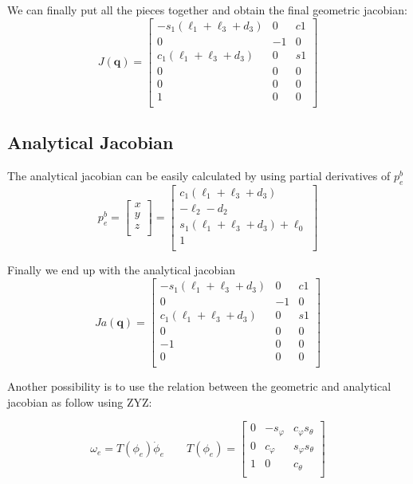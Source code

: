 \documentclass[a4paper,12pt]{article}
\renewcommand*{\l}{\ell}
\newcommand*{\q}{\bm{q}}
\begin{document}
We can finally put all the pieces together and obtain the final geometric jacobian:
\[
J(\q) = 
\begin{bmatrix}
    -s_1(\l_1 + \l_3 + d_3) &  0 & c1 \\
     0 &  -1 & 0 \\
     c_1(\l_1 + \l_3 + d_3) & 0 & s1 \\
    0 & 0 & 0 \\
    0 & 0 & 0 \\
    1 & 0 & 0 \\
\end{bmatrix}
\]

\subsection{Analytical Jacobian}
The analytical jacobian can be easily calculated by using partial derivatives of $p^b_e$
\[
p^b_e = \begin{bmatrix}
    x \\ y \\ z \\
\end{bmatrix}
=
\begin{bmatrix}
    c_1(\l_1+\l_3+d_3)\\
     -\l_2 - d_2 \\
    s_1(\l_1+\l_3+d_3) + \l_0 \\
    1        \\
\end{bmatrix}
\]

\noindent Finally we end up with the analytical jacobian
\[
Ja(\q) = 
\begin{bmatrix}
    -s_1(\l_1 + \l_3 + d_3) &  0 & c1 \\
     0 &  -1 & 0 \\
     c_1(\l_1 + \l_3 + d_3) & 0 & s1 \\
    0 & 0 & 0 \\
    -1 & 0 & 0 \\
    0 & 0 & 0 \\
\end{bmatrix}
\]

\noindent Another possibility is to use the relation between the geometric and analytical jacobian as follow using ZYZ:

\[
\omega_e = T(\phi_e)\dot{\phi}_e
\qquad
T(\phi_e) = \begin{bmatrix}
    0 & -s_\varphi & c_\varphi s_\theta \\
    0 &  c_\varphi & s_\varphi s_\theta \\
    1 &          0 &           c_\theta \\
\end{bmatrix}
\]
\end{document}
